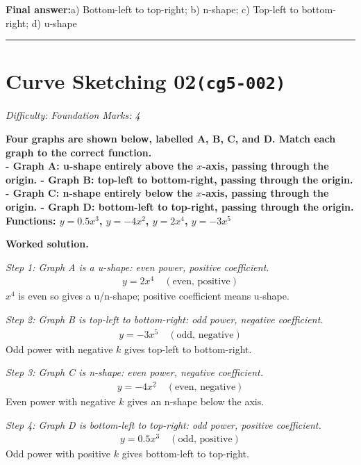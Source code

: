 \documentclass[11pt]{article}
\newcommand{\question}[1]{\par\medskip\noindent\textbf{#1}\par}
\begin{document}
\begin{answerbox}
\textbf{Final answer:}\quad a) Bottom-left to top-right; b) n-shape; c) Top-left to bottom-right; d) u-shape
\end{answerbox}
\medskip\hrule

\section*{Curve Sketching 02\quad\small\texttt{(cg5-002)}}
\textit{Difficulty: Foundation \quad\textbar\quad Marks: 4}

\question{Four graphs are shown below, labelled A, B, C, and D. Match each graph to the correct function. \\[3pt] - Graph A: u-shape entirely above the \(x\)-axis, passing through the origin. - Graph B: top-left to bottom-right, passing through the origin. - Graph C: n-shape entirely below the \(x\)-axis, passing through the origin. - Graph D: bottom-left to top-right, passing through the origin. \\[3pt] Functions: \( y = 0.5x^3 \), \( y = -4x^2 \), \( y = 2x^4 \), \( y = -3x^5 \)}

\textbf{Worked solution.}

\textit{Step 1: Graph A is a u-shape: even power, positive coefficient.}
\[\begin{gathered}
y = 2x^4 \quad (\text{even, positive})
\end{gathered}\]
\( x^4 \) is even so gives a u/n-shape; positive coefficient means u-shape.

\textit{Step 2: Graph B is top-left to bottom-right: odd power, negative coefficient.}
\[\begin{gathered}
y = -3x^5 \quad (\text{odd, negative})
\end{gathered}\]
Odd power with negative \( k \) gives top-left to bottom-right.

\textit{Step 3: Graph C is n-shape: even power, negative coefficient.}
\[\begin{gathered}
y = -4x^2 \quad (\text{even, negative})
\end{gathered}\]
Even power with negative \( k \) gives an n-shape below the axis.

\textit{Step 4: Graph D is bottom-left to top-right: odd power, positive coefficient.}
\[\begin{gathered}
y = 0.5x^3 \quad (\text{odd, positive})
\end{gathered}\]
Odd power with positive \( k \) gives bottom-left to top-right.
\end{document}

